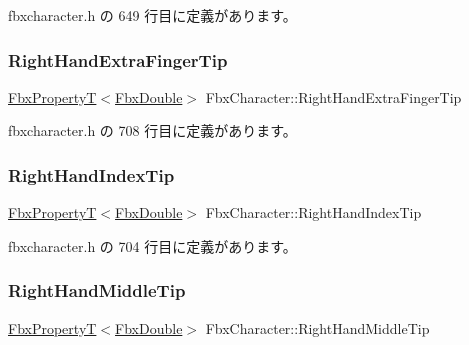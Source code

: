  fbxcharacter.\+h の 649 行目に定義があります。

\mbox{\label{class_fbx_character_aac0b926d798f6d825aa3b00aa34001ba}} 
\subsubsection{\texorpdfstring{Right\+Hand\+Extra\+Finger\+Tip}{RightHandExtraFingerTip}}
{\footnotesize\ttfamily \hyperlink{class_fbx_property_t}{Fbx\+PropertyT}$<$\hyperlink{fbxtypes_8h_a171e72a1c46fc15c1a6c9c31948c1c5b}{Fbx\+Double}$>$ Fbx\+Character\+::\+Right\+Hand\+Extra\+Finger\+Tip}



 fbxcharacter.\+h の 708 行目に定義があります。

\mbox{\label{class_fbx_character_a7599d646c7b02676c0f769b23d62d9ee}} 
\subsubsection{\texorpdfstring{Right\+Hand\+Index\+Tip}{RightHandIndexTip}}
{\footnotesize\ttfamily \hyperlink{class_fbx_property_t}{Fbx\+PropertyT}$<$\hyperlink{fbxtypes_8h_a171e72a1c46fc15c1a6c9c31948c1c5b}{Fbx\+Double}$>$ Fbx\+Character\+::\+Right\+Hand\+Index\+Tip}



 fbxcharacter.\+h の 704 行目に定義があります。

\mbox{\label{class_fbx_character_aee0243e27c5375f5e34ffdf222982f91}} 
\subsubsection{\texorpdfstring{Right\+Hand\+Middle\+Tip}{RightHandMiddleTip}}
{\footnotesize\ttfamily \hyperlink{class_fbx_property_t}{Fbx\+PropertyT}$<$\hyperlink{fbxtypes_8h_a171e72a1c46fc15c1a6c9c31948c1c5b}{Fbx\+Double}$>$ Fbx\+Character\+::\+Right\+Hand\+Middle\+Tip}



